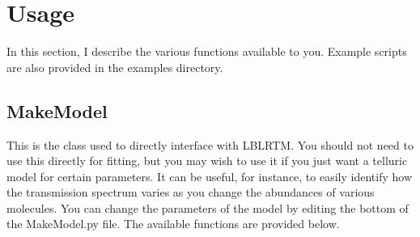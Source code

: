 \documentclass{article}
\begin{document}
\section{Usage}
\label{sec:usage}
In this section, I describe the various functions available to you. Example scripts are also provided in the examples directory. 

\subsection{MakeModel}
\label{subsec:makemodel}
This is the class used to directly interface with LBLRTM. You should not need to use this directly for fitting, but you may wish to use it if you just want a telluric model for certain parameters. It can be useful, for instance, to easily identify how the transmission spectrum varies as you change the abundances of various molecules. You can change the parameters of the model by editing the bottom of the MakeModel.py file. The available functions are provided below.
\end{document}
